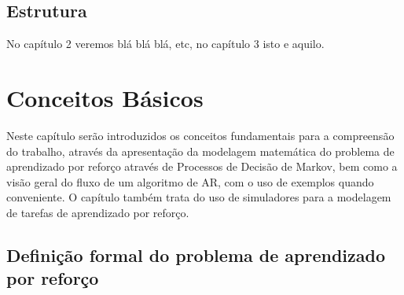 \documentclass[cic,tc]{iiufrgs}
\newcommand\bruno[1]{\textcolor{magenta}{#1}}
\begin{document}

\section{Estrutura}
No capítulo 2 veremos blá blá blá, etc, no capítulo 3 isto e aquilo.


\chapter{Conceitos Básicos}
Neste capítulo serão introduzidos os conceitos fundamentais para a compreensão
do trabalho, através da apresentação da modelagem matemática do problema de
aprendizado por reforço através de Processos de Decisão de Markov, bem como a
visão geral do fluxo de um algoritmo de AR, com o uso de exemplos quando
conveniente. O capítulo também trata do uso de simuladores para a modelagem de
tarefas de aprendizado por reforço.

%

\section{Definição formal do problema de aprendizado por reforço}
\end{document}
